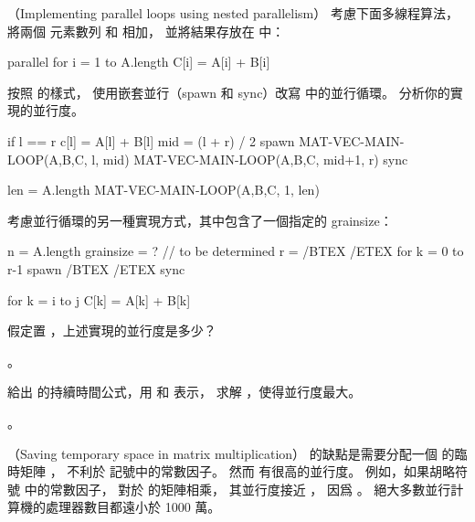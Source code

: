 \startsubject[
  title={Problems},
]

\startPROBLEM
（Implementing parallel loops using nested parallelism）
考慮下面多線程算法，將兩個  元素數列  和  相加，
並將結果存放在  中：

\startCLRS
parallel for i = 1 to A.length
	C[i] = A[i] + B[i]
\stopCLRS

\startigBase[a]\startitem
按照  的樣式，
使用嵌套並行（spawn 和 sync）改寫  中的並行循環。
分析你的實現的並行度。
\stopitem\stopigBase

\startANSWER
{}
\startCLRS
if l == r
	c[l] = A[l] + B[l]
mid = (l + r) / 2
spawn MAT-VEC-MAIN-LOOP(A,B,C, l, mid)
MAT-VEC-MAIN-LOOP(A,B,C, mid+1, r)
sync
\stopCLRS

\startCLRS
len = A.length
MAT-VEC-MAIN-LOOP(A,B,C, 1, len)
\stopCLRS
\stopANSWER

考慮並行循環的另一種實現方式，其中包含了一個指定的 grainsize：

\startCLRS
n = A.length
grainsize = ?		// to be determined
r = /BTEX  /ETEX
for k = 0 to r-1
	spawn /BTEX  /ETEX
sync
\stopCLRS

\startCLRS
for k = i to j
	C[k] = A[k] + B[k]
\stopCLRS

\startigBase[continue]\startitem
假定置 ，上述實現的並行度是多少？
\stopitem\stopigBase

\startANSWER
{}。
\stopANSWER

\startigBase[continue]\startitem
給出  的持續時間公式，用  和  表示，
求解 ，使得並行度最大。
\stopitem\stopigBase

\startANSWER
{}。
\stopANSWER

\stopPROBLEM

\startPROBLEM
（Saving temporary space in matrix multiplication）
  的缺點是需要分配一個  的臨時矩陣 ，
不利於 \m{\Theta} 記號中的常數因子。
然而  有很高的並行度。
例如，如果胡略符號 \m{\Theta} 中的常數因子，
對於  的矩陣相乘，
其並行度接近 ，
因爲 。
絕大多數並行計算機的處理器數目都遠小於 1000 萬。

